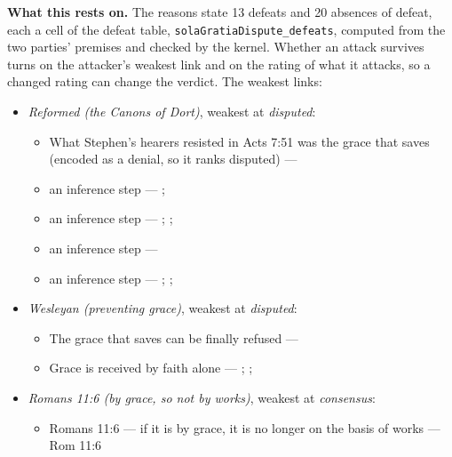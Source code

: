 \documentclass[11pt]{article}
\begin{document}
\par\noindent\textbf{What this rests on.} The reasons state 13 defeats and 20 absences of defeat, each a cell of the defeat table, \texttt{sola\allowbreak{}Gratia\allowbreak{}Dispute\_\allowbreak{}defeats}, computed from the two parties' premises and checked by the kernel. Whether an attack survives turns on the attacker's weakest link and on the rating of what it attacks, so a changed rating can change the verdict. The weakest links:
\begin{itemize}
\item \emph{Reformed (the Canons of Dort)}, weakest at \emph{disputed}:
\begin{itemize}
\item What Stephen’s hearers resisted in Acts 7:51 was the grace that saves (encoded as a denial, so it ranks disputed) --- \cite[Canons of Dort, III/IV, art. 9]{schaff-creeds-christendom-3-1977}
\item an inference step --- \cite[ad loc. Eph 2:8]{robertson-word-pictures-4-1931}; \cite[228--229]{calvin-galatians-ephesians-1854}
\item an inference step --- \cite[600]{arminius-works-1-1825}; \cite[681]{arminius-works-1-1825}; \cite[Five Arminian Articles (1610), art. 4]{schaff-creeds-christendom-3-1977}
\item an inference step --- \cite[527--565]{arminius-works-3-1853}
\item an inference step --- \cite[Solid Declaration II.89]{concordia-triglotta-1921}; \cite[Solid Declaration II.60]{concordia-triglotta-1921}; \cite[Solid Declaration XI.41]{concordia-triglotta-1921}
\end{itemize}
\item \emph{Wesleyan (preventing grace)}, weakest at \emph{disputed}:
\begin{itemize}
\item The grace that saves can be finally refused --- \cite[397]{wesley-works-9-1827}
\item Grace is received by faith alone --- \cite[Augsburg Confession IV.1–3]{concordia-triglotta-1921}; \cite[Sermon 1, III.1]{wesley-sermons-1872}; \cite[Trent, Session VI (1547), canon 9]{tanner-decrees-1990}
\end{itemize}
\item \emph{Romans 11:6 (by grace, so not by works)}, weakest at \emph{consensus}:
\begin{itemize}
\item Romans 11:6 — if it is by grace, it is no longer on the basis of works --- Rom 11:6

\end{itemize}
\end{itemize}
\end{document}

